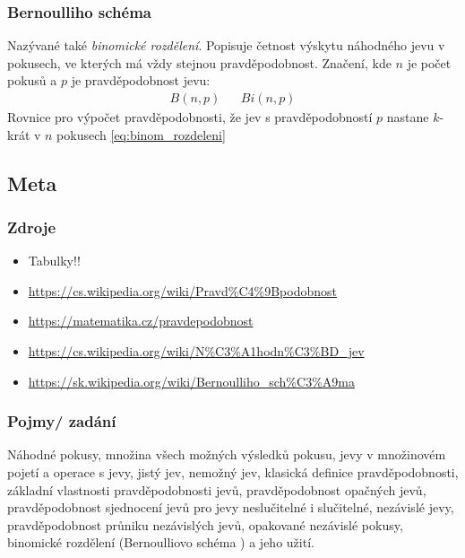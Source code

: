 \documentclass[12pt]{article}
\begin{document}
\subsubsection{Bernoulliho schéma}
Nazývané také \emph{binomické rozdělení}. Popisuje četnost výskytu náhodného jevu v  pokusech, ve kterých má vždy stejnou pravděpodobnost. Značení, kde $n$ je počet pokusů a $p$ je pravděpodobnost jevu:
\begin{align}
B(n,p) && Bi(n,p) 
\end{align}
Rovnice pro výpočet pravděpodobnosti, že jev s pravděpodobností $p$ nastane $k$-krát v $n$ pokusech \eqref{eq:binom_rozdeleni}
\subsection{Meta}
\subsubsection{Zdroje}
\begin{itemize}
\item Tabulky!!
\item \url{https://cs.wikipedia.org/wiki/Pravd\%C4\%9Bpodobnost}
\item \url{https://matematika.cz/pravdepodobnost}
\item \url{https://cs.wikipedia.org/wiki/N\%C3\%A1hodn\%C3\%BD_jev}
\item \url{https://sk.wikipedia.org/wiki/Bernoulliho_sch\%C3\%A9ma} %
\end{itemize}
\subsubsection{Pojmy/ zadání}
Náhodné pokusy, množina všech možných výsledků pokusu, jevy v množinovém pojetí a operace s jevy, jistý jev, nemožný jev, klasická definice pravděpodobnosti, základní vlastnosti pravděpodobnosti jevů, pravděpodobnost opačných jevů, pravděpodobnost sjednocení jevů pro jevy neslučitelné i slučitelné, nezávislé jevy, pravděpodobnost průniku nezávislých jevů, opakované nezávislé pokusy, binomické rozdělení (Bernoulliovo schéma ) a jeho užití.
\end{document}
